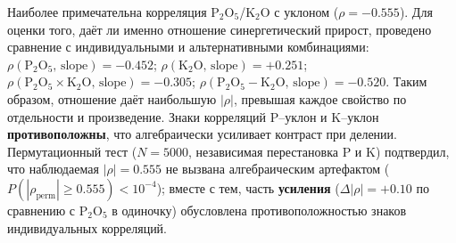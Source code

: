 Наиболее примечательна корреляция P$_2$O$_5$/K$_2$O с уклоном ($\rho = -0.555$). Для оценки того, даёт ли именно отношение синергетический прирост, проведено сравнение с индивидуальными и альтернативными комбинациями: $\rho(\text{P}_2\text{O}_5,\, \text{slope}) = -0.452$; $\rho(\text{K}_2\text{O},\, \text{slope}) = +0.251$; $\rho(\text{P}_2\text{O}_5 \times \text{K}_2\text{O},\, \text{slope}) = -0.305$; $\rho(\text{P}_2\text{O}_5 - \text{K}_2\text{O},\, \text{slope}) = -0.520$. Таким образом, отношение даёт наибольшую $|\rho|$, превышая каждое свойство по отдельности и произведение. Знаки корреляций P--уклон и K--уклон \textbf{противоположны}, что алгебраически усиливает контраст при делении. Пермутационный тест ($N = 5000$, независимая перестановка P и K) подтвердил, что наблюдаемая $|\rho| = 0.555$ не вызвана алгебраическим артефактом ($P(|\rho_{\text{perm}}| \geq 0.555) < 10^{-4}$); вместе с тем, часть \textbf{усиления} ($\Delta|\rho| = +0.10$ по сравнению с $\text{P}_2\text{O}_5$ в одиночку) обусловлена противоположностью знаков индивидуальных корреляций.
